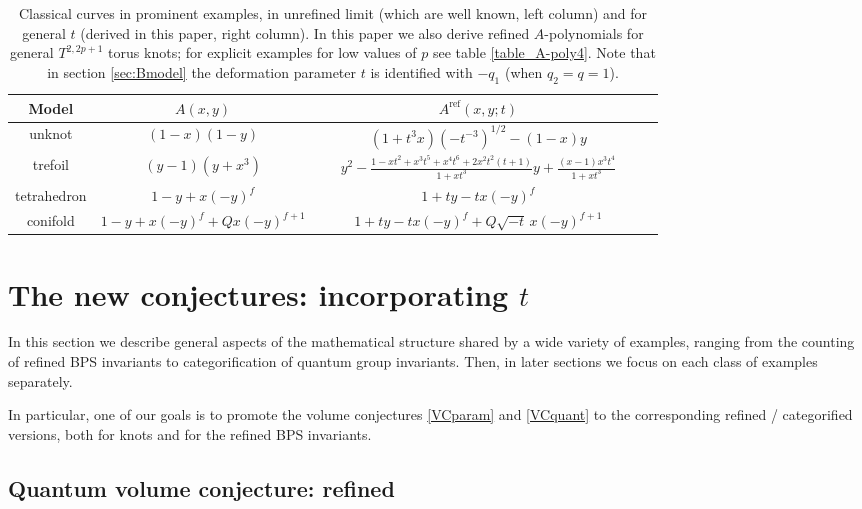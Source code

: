 \documentclass[hyper,letterpaper]{JHEP3}
\begin{document}
\begin{table}[h]
\centering
\begin{tabular}{|@{$\Bigm|$}c|c@{$\Bigm|$}c|c@{$\Bigm|$}|}
\hline
\rule{0pt}{5mm}
\textbf{Model} & $A(x,y)$ & $A^{\text{ref}} (x,y;t)$  \\[3pt]
\hline
\hline
\rule{0pt}{5mm}
unknot & $(1-x)(1-y)$ & $(1 + t^3 x) ( - t^{-3})^{1/2} - (1 - x) y$  \\[3pt]
\hline
\rule{0pt}{5mm}
trefoil & $(y-1) (y + x^3)$ & ~~~$y^2 -\frac{1 - x t^2 + x^3 t^5 + x^4 t^6 + 2 x^2 t^2 (t+1)}{1
+ x t^3} y + \frac{(x-1) x^3 t^4}{1 + x t^3}$~~~    \\[3pt]
\hline
\rule{0pt}{5mm}
tetrahedron & $1 - y + x(-y)^f$ & $1 + t y - t x (-y)^f$   \\[3pt]
\hline
\rule{0pt}{5mm}
conifold & $1 - y + x(-y)^f + Q x (-y)^{f+1}$ & $1 + t y - t x (-y)^f + Q \sqrt{-t} \, x (-y)^{f+1}$  \\[3pt]
\hline
\end{tabular}
\caption{Classical curves in prominent examples, in unrefined limit (which are well known, left column) and for general $t$ (derived in this paper, right column). In this paper we also derive refined $A$-polynomials for general $T^{2,2p+1}$ torus knots; for explicit examples for low values of $p$ see table \protect\ref{table_A-poly4}. Note that in section \protect\ref{sec:Bmodel} the deformation parameter $t$ is identified with $-q_1$ (when $q_2 = q = 1$). \label{table} }
\end{table}


\section{The new conjectures: incorporating $t$}

In this section we describe general aspects of the mathematical structure shared by a wide variety of
examples, ranging from the counting of refined BPS invariants to categorification of quantum group invariants.
Then, in later sections we focus on each class of examples separately.

In particular, one of our goals is to promote the volume conjectures \eqref{VCparam}
and \eqref{VCquant} to the corresponding refined / categorified versions, both for knots and for the refined BPS invariants.

\subsection{Quantum volume conjecture: refined}
\end{document}
